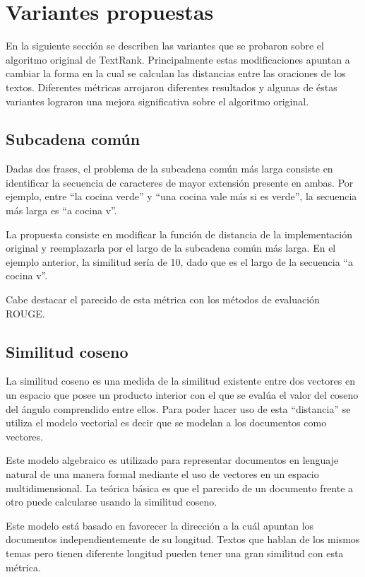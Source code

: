 \documentclass{llncs}
\begin{document}
\section{Variantes propuestas}

En la siguiente sección se describen las variantes que se probaron sobre el algoritmo original de
TextRank. Principalmente estas modificaciones apuntan a cambiar la forma en la cual se calculan las distancias entre las oraciones de los textos. Diferentes métricas arrojaron diferentes resultados y algunas de éstas variantes lograron una mejora significativa sobre el algoritmo original.

\subsection{Subcadena común}
Dadas dos frases, el problema de la subcadena común más larga consiste en identificar la secuencia de caracteres de mayor extensión presente en ambas. Por ejemplo, entre “la cocina verde” y “una cocina vale más si es verde”, la secuencia más larga es “a cocina v”.

La propuesta consiste en modificar la función de distancia de la implementación original y reemplazarla por el largo de la subcadena común más larga. En el ejemplo anterior, la similitud sería de 10, dado que es el largo de la secuencia “a cocina v”.

Cabe destacar el parecido de esta métrica con los métodos de evaluación ROUGE.


\subsection{Similitud coseno}
La similitud coseno es una medida de la similitud existente entre dos vectores en un espacio que posee un producto interior con el que se evalúa el valor del coseno del ángulo comprendido entre ellos. Para poder hacer uso de esta “distancia” se utiliza el modelo vectorial es decir que se modelan a los documentos como vectores.

Este modelo algebraico es utilizado para representar documentos en lenguaje natural de una manera formal mediante el uso de vectores en un espacio multidimensional. La teórica básica es que el parecido de un documento frente a otro puede calcularse usando la similitud coseno. 

Este modelo está basado en favorecer la dirección a la cuál apuntan los documentos independientemente de su longitud. Textos que hablan de los mismos temas pero tienen diferente longitud pueden tener una gran similitud con esta métrica. 
\end{document}
